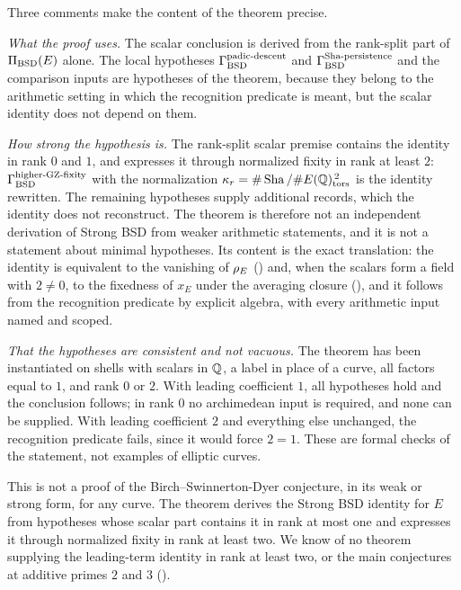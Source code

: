 Three comments make the content of the theorem precise.

\emph{What the proof uses.}  The scalar conclusion is derived from the
rank-split part of $\Pi_{\mathrm{BSD}}(E)$ alone.  The local hypotheses $\Gamma_{\mathrm{BSD}}^{\mathrm{padic\text{-}descent}}$
and $\Gamma_{\mathrm{BSD}}^{\mathrm{Sha\text{-}persistence}}$ and the comparison inputs are hypotheses of the theorem,
because they belong to the arithmetic setting in which the recognition
predicate is meant, but the scalar identity does not depend on them.

\emph{How strong the hypothesis is.}  The rank-split scalar premise
contains the identity in rank $0$ and $1$, and expresses it through
normalized fixity in rank at least $2$: $\Gamma_{\mathrm{BSD}}^{\mathrm{higher\text{-}GZ\text{-}fixity}}$ with the normalization
$\kappa_r=\#\operatorname{Sha}/\#E(\mathbb{Q})_{\operatorname{tors}}^{\,2}$ is the identity rewritten.  The
remaining hypotheses supply additional records, which the identity does
not reconstruct.  The theorem is therefore not an independent derivation of
Strong BSD from weaker arithmetic statements, and it is not a statement
about minimal hypotheses.  Its content is the exact translation: the
identity is equivalent to the vanishing of $\rho_E$
() and, when the scalars form a
field with $2\neq0$, to the fixedness of $x_E$ under the averaging closure
(),
and it follows from the recognition predicate by explicit algebra, with
every arithmetic input named and scoped.

\emph{That the hypotheses are consistent and not vacuous.}  The theorem
has been instantiated on shells with scalars in $\mathbb{Q}$, a label in place of
a curve, all factors equal to $1$, and rank $0$ or $2$.  With leading
coefficient $1$, all hypotheses hold and the conclusion follows; in rank
$0$ no archimedean input is required, and none can be supplied.  With
leading coefficient $2$ and everything else unchanged, the recognition
predicate fails, since it would force $2=1$.  These are formal checks of
the statement, not examples of elliptic curves.

\begin{nonclaim}\label{nonclaim:closure:landing-conditional}
This is not a proof of the Birch--Swinnerton-Dyer conjecture, in its weak
or strong form, for any curve.  The theorem derives the Strong BSD
identity for $E$ from hypotheses whose scalar part contains it in rank at
most one and expresses it through normalized fixity in rank at least two.
We know of no theorem supplying the leading-term identity in rank at
least two, or the main conjectures at additive primes $2$ and $3$
().
\end{nonclaim}
